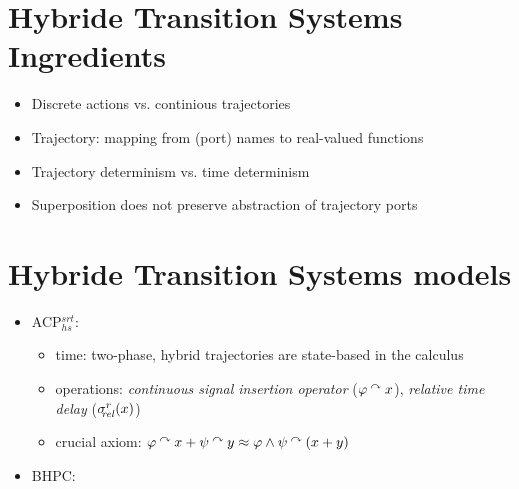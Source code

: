 \begin{slide}
\newslide\section*{Hybride Transition Systems Ingredients}
\begin{itemize}
\item Discrete actions vs. continious trajectories
\item Trajectory: mapping from (port) names to real-valued functions
\pause
\item Trajectory determinism vs. time determinism
  \begin{center}
  
  \end{center}
\item Superposition does not preserve abstraction of trajectory ports
\end{itemize}
\newslide\section*{Hybride Transition Systems models}
\begin{itemize}
\item ACP$^{srt}_{hs}$:
  \begin{itemize}
  \item time: two-phase, hybrid trajectories are state-based in the calculus
  \item operations: \emph{continuous signal insertion operator} ($\varphi\mathbin{\mathop{^\curvearrowright}} x$),
    \emph{relative time delay} ($\mathop{\sigma_{\!\!\mathit{rel}}^{r}}(x)$)
  \item crucial axiom: $\varphi\mathbin{\mathop{^\curvearrowright}} x+\psi\mathbin{\mathop{^\curvearrowright}} y\approx \varphi\wedge\psi\mathbin{\mathop{^\curvearrowright}}(x+y)$
  \end{itemize}
\pause
\item BHPC: 
  \begin{itemize}

\end{itemize}
\end{itemize}
\end{slide}
